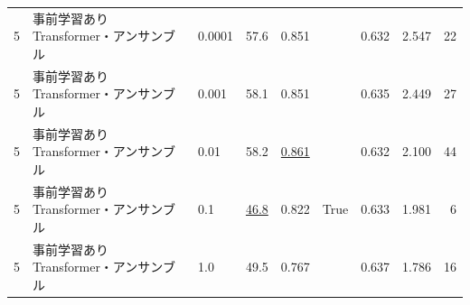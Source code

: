 \documentclass[12pt]{jarticle}
\numberwithin{equation}{section}    %
\numberwithin{figure}{section}      %
\numberwithin{table}{section}      %
\begin{document}
\begin{table}[bt]
\begin{center}
{\begin{tabular}{|l|l|l|rrc|rrr|}
                \hline
                5                        & 事前学習ありTransformer・アンサンブル & 0.0001                                   & 57.6                         & 0.851                     &                            & 0.632                         & 2.547                             & 22                         \\
                5                        & 事前学習ありTransformer・アンサンブル & 0.001                                    & 58.1                         & 0.851                     &                            & 0.635                         & 2.449                             & 27                         \\
                5                        & 事前学習ありTransformer・アンサンブル & 0.01                                     & 58.2                         & \underline{0.861}         &                            & 0.632                         & 2.100                             & 44                         \\
                5                        & 事前学習ありTransformer・アンサンブル & 0.1                                      & \underline{46.8}             & 0.822                     & True                       & 0.633                         & 1.981                             & 6                          \\
                5                        & 事前学習ありTransformer・アンサンブル & 1.0                                      & 49.5                         & 0.767                     &                            & 0.637                         & 1.786                             & 16                         \\
                \hline
            \end{tabular}
        }
    \end{center}
\end{table}
\end{document}
